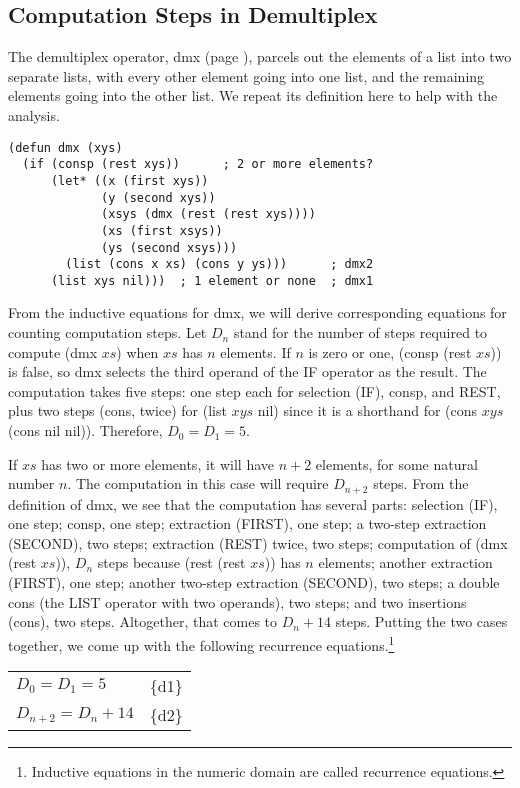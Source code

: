 \subsection{Computation Steps in Demultiplex}
\label{subsec:dmx-steps}

The demultiplex operator, dmx (page \pageref{dmx-defun}), parcels out the elements of a list
into two separate lists, with every other element going into one list,
and the remaining elements going into the other list.
We repeat its definition here to help with the analysis.

\label{defun:dmx-copy}
\begin{Verbatim}
(defun dmx (xys)
  (if (consp (rest xys))      ; 2 or more elements?
      (let* ((x (first xys))
             (y (second xys))
             (xsys (dmx (rest (rest xys))))
             (xs (first xsys))
             (ys (second xsys)))
        (list (cons x xs) (cons y ys)))      ; dmx2
      (list xys nil)))  ; 1 element or none  ; dmx1
\end{Verbatim}

From the inductive equations for dmx,
we will derive corresponding equations for counting computation steps.
Let $D_n$ stand for the number of steps required
to compute (dmx $xs$) when $xs$ has $n$ elements.
If $n$ is zero or one, (consp (rest $xs$)) is false,
so dmx selects the third operand of the IF operator as the result.
The computation takes five steps: one step each for selection (IF),
consp, and REST, plus two steps (cons, twice) for (list $xys$ nil)
since it is a shorthand for (cons $xys$ (cons nil nil)).
Therefore, $D_0 = D_1 = 5$.

If $xs$ has two or more elements, it will have $n+2$ elements,
for some natural number $n$.
The computation in this case will require $D_{n+2}$ steps.
From the definition of dmx, we see that the computation
has several parts:
selection (IF), one step;
consp, one step;
extraction (FIRST), one step;
a two-step extraction (SECOND), two steps;
extraction (REST) twice, two steps;
computation of (dmx (rest $xs$)),
$D_n$ steps because (rest (rest $xs$)) has $n$ elements;
another extraction (FIRST), one step;
another two-step extraction (SECOND), two steps;
a double cons (the LIST operator with two operands), two steps; and
two insertions (cons), two steps.
Altogether, that comes to $D_n + 14$ steps.
Putting the two cases together,
we come up with the following recurrence equations.\footnote{Inductive
equations in the numeric domain are called
\label{def:recurrence-equations} recurrence equations.}
\begin{center}
\begin{tabular}{ll}
  $D_0 = D_1 = 5$      & \{d1\} \\
  $D_{n+2} = D_n + 14$ & \{d2\} \\
\end{tabular}
\end{center}

